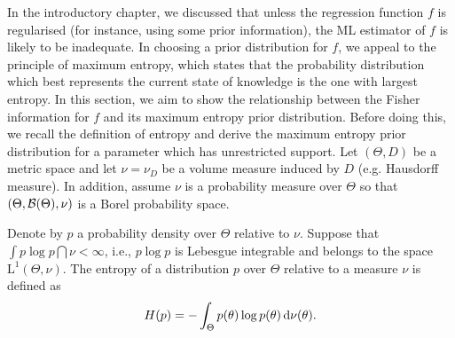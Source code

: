 In the introductory chapter, we discussed that unless the regression function $f$ is regularised (for instance, using some prior information), the ML estimator of $f$ is likely to be inadequate.
In choosing a prior distribution for $f$, we appeal to the principle of maximum entropy, which states that the probability distribution which best represents the current state of knowledge is the one with largest entropy.
In this section, we aim to show the relationship between the Fisher information for $f$ and its maximum entropy prior distribution.
Before doing this, we recall the definition of entropy and derive the maximum entropy prior distribution for a parameter which has unrestricted support.
Let $(\Theta,D)$ be a metric space and let $\nu = \nu_D$ be a volume measure induced by $D$ (e.g. Hausdorff measure).
In addition, assume $\nu$ is a probability measure over $\Theta$ so that $(\Theta,{\mathcal B}(\Theta),\nu)$ is a Borel probability space.

\begin{definition}[Entropy]\label{def:entropy}
  Denote by $p$ a probability density over $\Theta$ relative to $\nu$.
  Suppose that $\int p\log p \dint \nu < \infty$, i.e., $p \log p$ is Lebesgue integrable and belongs to the space $\text{L}^1(\Theta,\nu)$.
  The entropy of a distribution $p$ over $\Theta$ relative to a measure $\nu$ is defined as
  \begin{align}\label{eq:entrop}
    H(p) = - \int_\Theta p(\theta) \log p(\theta) \, \text{d}\nu(\theta).
  \end{align}
\end{definition}


